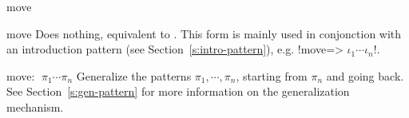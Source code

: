 \begin{tactic}{move}
  \begin{tsyntax}{move}
     Does nothing, equivalent to . This form is mainly
     used in conjonction with an introduction pattern (see
     Section~\ref{s:intro-pattern}), e.g. \ls!move=> $\iota_1 \cdots \iota_n$!.
  \end{tsyntax}

  \begin{tsyntax}{move: $\;\pi_1 \cdots \pi_n$}
    Generalize the patterns $\pi_1, \cdots, \pi_n$, starting from
    $\pi_n$ and going back. See Section~\ref{s:gen-pattern} for more
    information on the generalization mechanism.
  \end{tsyntax}
\end{tactic}
